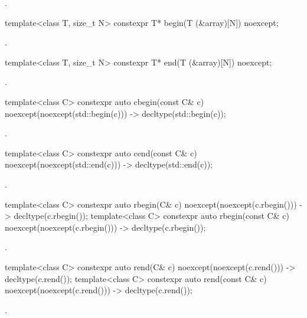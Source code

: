 \begin{itemdescr}
\pnum
\returns
{}.
\end{itemdescr}

%
\begin{itemdecl}
template<class T, size_t N> constexpr T* begin(T (&array)[N]) noexcept;
\end{itemdecl}

\begin{itemdescr}
\pnum
\returns
{}.
\end{itemdescr}

%
\begin{itemdecl}
template<class T, size_t N> constexpr T* end(T (&array)[N]) noexcept;
\end{itemdecl}

\begin{itemdescr}
\pnum
\returns
{}.
\end{itemdescr}

%
\begin{itemdecl}
template<class C> constexpr auto cbegin(const C& c) noexcept(noexcept(std::begin(c)))
  -> decltype(std::begin(c));
\end{itemdecl}
\begin{itemdescr}
\pnum
\returns
{}.
\end{itemdescr}

%
\begin{itemdecl}
template<class C> constexpr auto cend(const C& c) noexcept(noexcept(std::end(c)))
  -> decltype(std::end(c));
\end{itemdecl}
\begin{itemdescr}
\pnum
\returns
{}.
\end{itemdescr}

%
\begin{itemdecl}
template<class C> constexpr auto rbegin(C& c) noexcept(noexcept(c.rbegin()))
  -> decltype(c.rbegin());
template<class C> constexpr auto rbegin(const C& c) noexcept(noexcept(c.rbegin()))
  -> decltype(c.rbegin());
\end{itemdecl}
\begin{itemdescr}
\pnum
\returns
{}.
\end{itemdescr}

%
\begin{itemdecl}
template<class C> constexpr auto rend(C& c) noexcept(noexcept(c.rend())) -> decltype(c.rend());
template<class C> constexpr auto rend(const C& c) noexcept(noexcept(c.rend()))
  -> decltype(c.rend());
\end{itemdecl}
\begin{itemdescr}
\pnum
\returns
{}.
\end{itemdescr}

